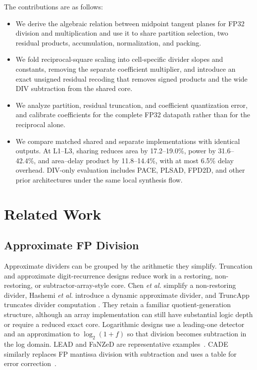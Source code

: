 \documentclass[conference]{IEEEtran}
\begin{document}
The contributions are as follows:
\begin{itemize}
  \item We derive the algebraic relation between midpoint tangent planes for
  FP32 division and multiplication and use it to share partition selection,
  two residual products, accumulation, normalization, and packing.

  \item We fold reciprocal-square scaling into cell-specific divider slopes
  and constants, removing the separate coefficient multiplier, and introduce
  an exact unsigned residual recoding that removes signed products and the
  wide DIV subtraction from the shared core.

  \item We analyze partition, residual truncation, and coefficient
  quantization error, and calibrate coefficients for the complete FP32
  datapath rather than for the reciprocal alone.

  \item We compare matched shared and separate implementations with identical
  outputs. At L1--L3, sharing reduces area by 17.2--19.0\%, power by
  31.6--42.4\%, and area--delay product by 11.8--14.4\%, with at most 6.5\%
  delay overhead. DIV-only evaluation includes PACE, PLSAD, FPD2D, and other
  prior architectures under the same local synthesis flow.
\end{itemize}
\section{Related Work}
\subsection{Approximate FP Division}
Approximate dividers can be grouped by the arithmetic they simplify.
Truncation and approximate digit-recurrence designs reduce work in a restoring,
non-restoring, or subtractor-array-style core. Chen \emph{et al.} simplify a
non-restoring divider, Hashemi \emph{et al.} introduce a dynamic approximate
divider, and TruncApp truncates divider computation
\cite{chen2015nonrestoring,hashemi2016dynamic,vahdat2017truncapp}. They retain
a familiar quotient-generation structure, although an array implementation can
still have substantial logic depth or require a reduced exact core. Logarithmic
designs use a leading-one detector and an approximation to $\log_2(1+f)$ so
that division becomes subtraction in the log domain. LEAD and FaNZeD are
representative examples~\cite{ratnaparkhi2022lead,saadat2019fanzed}. CADE
similarly replaces FP mantissa division with subtraction and uses a table for
error correction~\cite{imani2019cade}.
\end{document}
